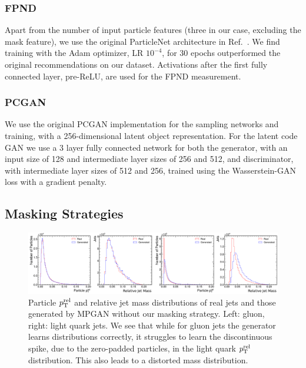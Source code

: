 \subsubsection{FPND}
\label{app:04_mpgan_pnet}

Apart from the number of input particle features (three in our case, excluding the mask feature), we use the original ParticleNet architecture in Ref.~\cite{Qu:2019gqs}.
We find training with the Adam optimizer, LR $10^{-4}$, for 30 epochs outperformed the original recommendations on our dataset.
Activations after the first fully connected layer, pre-ReLU, are used for the FPND measurement.

\subsubsection{PCGAN}
\label{app:04_mpgan_pcgan}

We use the original PCGAN implementation for the sampling networks and training, with a 256-dimensional latent object representation.
For the latent code GAN we use a 3 layer fully connected network for both the generator, with an input size of 128 and intermediate layer sizes of 256 and 512, and discriminator, with intermediate layer sizes of 512 and 256, trained using the Wasserstein-GAN~\cite{WGAN} loss with a gradient penalty.


\subsection{Masking Strategies}
\label{app:04_mpgan_masking}

\begin{figure}[t]
    \centering
    \centerline{\includegraphics[width=\textwidth]{figures/04-ML4Sim/mpgan/masking/zeropaddingfig.pdf}}
    \caption[Particle $\ptrel$ and relative jet mass distributions of real jets and those generated by MPGAN without our masking strategy.]{Particle $\ptrel$ and relative jet mass distributions of real jets and those generated by MPGAN without our masking strategy. Left: gluon, right: light quark jets.
    We see that while for gluon jets the generator learns distributions correctly, it struggles to learn the discontinuous spike, due to the zero-padded particles, in the light quark $\ptrel$ distribution.
    This also leads to a distorted mass distribution.
    }
    \label{fig:04_mpgan_zeropadding}
\end{figure}

